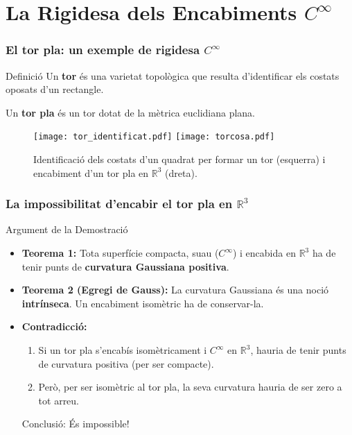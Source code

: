 \documentclass[10pt]{beamer}
\begin{document}
\section{La Rigidesa dels Encabiments $C^\infty$}

\begin{frame}
    \frametitle{El tor pla: un exemple de rigidesa $C^\infty$}

    \begin{block}{Definició}
        Un \textbf{tor} és una varietat topològica que resulta d'identificar els costats oposats d'un rectangle.
        
        Un \textbf{tor pla} és un tor dotat de la mètrica euclidiana plana.
    \end{block}
    
    \begin{figure}
        \texttt{[image: tor\_identificat.pdf]}
      \texttt{[image: torcosa.pdf]}
      \caption{Identificació dels costats d'un quadrat per formar un tor (esquerra) i encabiment d'un tor pla en $\mathbb{R}^3$ (dreta).}
  \end{figure}
  
    
\end{frame}

\begin{frame}
    \frametitle{La impossibilitat d'encabir el tor pla en $\mathbb{R}^3$}
    
    \begin{block}{Argument de la Demostració}
        \begin{itemize}
            \item \textbf{Teorema 1:} Tota superfície compacta, suau ($C^\infty$) i encabida en $\mathbb{R}^3$ ha de tenir punts de \textbf{curvatura Gaussiana positiva}.
            \pause
            \item \textbf{Teorema 2 (Egregi de Gauss):} La curvatura Gaussiana és una noció \textbf{intrínseca}. Un encabiment isomètric ha de conservar-la.
            \pause
            \item \textbf{Contradicció:}
            \begin{enumerate}
                \item Si un tor pla s'encabís isomètricament i $C^\infty$ en $\mathbb{R}^3$, hauria de tenir punts de curvatura positiva (per ser compacte).
                \item Però, per ser isomètric al tor pla, la seva curvatura hauria de ser zero a tot arreu.
            \end{enumerate}
            \pause
            \Large \centering \alert{Conclusió: És impossible!}
        \end{itemize}
    \end{block}
    
\end{frame}
\end{document}
